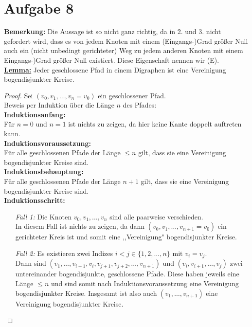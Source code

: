 \documentclass[a4paper,10pt,german]{scrartcl}
\begin{document}
\section*{Aufgabe 8}
{\bf Bemerkung:} Die Aussage ist so nicht ganz richtig, da in 2. und 3. nicht gefordert wird, dass es von jedem Knoten mit einem (Eingangs-)Grad größer Null auch ein (nicht unbedingt gerichteter) Weg zu jedem anderen Knoten mit einem Eingangs-)Grad größer Null existiert. Diese Eigenschaft nennen wir (E).\\[5pt]
\underline{{\bf Lemma:}} Jeder geschlossene Pfad in einem Digraphen ist eine Vereinigung bogendisjunkter Kreise.
\begin{proof}
Sei $(v_0,v_1,\dots,v_n=v_0)$ ein geschlossener Pfad.\\
Beweis per Induktion über die Länge $n$ des Pfades:\\
{\bf Induktionsanfang:}\\
Für $n=0$ und $n=1$ ist nichts zu zeigen, da hier keine Kante doppelt auftreten kann.\\
{\bf Induktionsvoraussetzung:}\\
Für alle geschlossenen Pfade der Länge $\leq n$ gilt, dass sie eine Vereinigung bogendisjunkter Kreise sind.\\
{\bf Induktionsbehauptung:}\\
Für alle geschlossenen Pfade der Länge $n+1$ gilt, dass sie eine Vereinigung bogendisjunkter Kreise sind.\\
{\bf Induktionsschritt:}
\begin{itemize}
 \item[\emph{Fall 1:}] Die Knoten $v_0,v_1,\dots,v_n$ sind alle paarweise verschieden.\\
In diesem Fall ist nichts zu zeigen, da dann $(v_0,v_1,\dots,v_{n+1}=v_0)$ ein gerichteter Kreis ist und somit eine ,,Vereinigung" bogendisjunkter Kreise.
\item[\emph{Fall 2:}]Es existieren zwei Indizes $i<j\in\{1,2,\dots,n\}$ mit $v_i=v_j$.\\
Dann sind $(v_1,\dots,v_{i-1},v_i,v_{j+1},v_{j+2},\dots,v_{n+1})$ und $(v_i,v_{i+1},\dots,v_j)$ zwei untereinander bogendisjunkte, geschlossene Pfade. Diese haben jeweils eine Länge $\leq n$ und sind somit nach Induktionsvoraussetzung eine Vereinigung bogendisjunkter Kreise. Insgesamt ist also auch $(v_1,\dots,v_{n+1})$ eine Vereinigung bogendisjunkter Kreise.
\end{itemize}
\end{proof}
\end{document}
